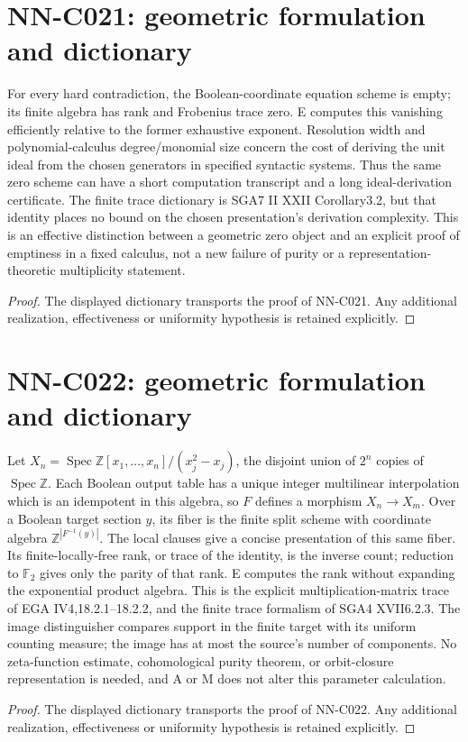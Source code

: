 \section{NN-C021: geometric formulation and dictionary}
\begin{geometricstatement}[NN-C021]
For every hard contradiction, the Boolean-coordinate equation scheme is empty; its finite algebra has rank and Frobenius trace zero. E computes this vanishing efficiently relative to the former exhaustive exponent. Resolution width and polynomial-calculus degree/monomial size concern the cost of deriving the unit ideal from the chosen generators in specified syntactic systems. Thus the same zero scheme can have a short computation transcript and a long ideal-derivation certificate. The finite trace dictionary is SGA7 II XXII Corollary3.2, but that identity places no bound on the chosen presentation's derivation complexity. This is an effective distinction between a geometric zero object and an explicit proof of emptiness in a fixed calculus, not a new failure of purity or a representation-theoretic multiplicity statement.
\end{geometricstatement}
\begin{proof} The displayed dictionary transports the proof of NN-C021. Any additional realization, effectiveness or uniformity hypothesis is retained explicitly.\end{proof}


\section{NN-C022: geometric formulation and dictionary}
\begin{geometricstatement}[NN-C022]
Let $X_n=\operatorname{Spec}\mathbb Z[x_1,\ldots,x_n]/(x_j^2-x_j)$, the disjoint union of $2^n$ copies of $\operatorname{Spec}\mathbb Z$. Each Boolean output table has a unique integer multilinear interpolation which is an idempotent in this algebra, so $F$ defines a morphism $X_n\to X_m$. Over a Boolean target section $y$, its fiber is the finite split scheme with coordinate algebra $\mathbb Z^{|F^{-1}(y)|}$. The local clauses give a concise presentation of this same fiber. Its finite-locally-free rank, or trace of the identity, is the inverse count; reduction to $\mathbb F_2$ gives only the parity of that rank. E computes the rank without expanding the exponential product algebra. This is the explicit multiplication-matrix trace of EGA IV4,18.2.1--18.2.2, and the finite trace formalism of SGA4 XVII6.2.3. The image distinguisher compares support in the finite target with its uniform counting measure; the image has at most the source's number of components. No zeta-function estimate, cohomological purity theorem, or orbit-closure representation is needed, and A or M does not alter this parameter calculation.
\end{geometricstatement}
\begin{proof} The displayed dictionary transports the proof of NN-C022. Any additional realization, effectiveness or uniformity hypothesis is retained explicitly.\end{proof}


